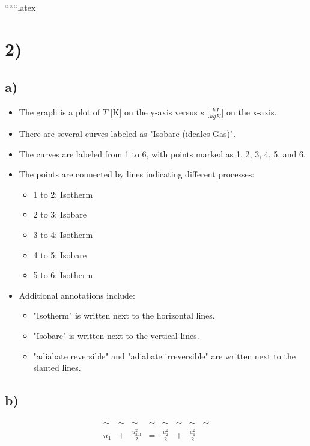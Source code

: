 
``````latex


\section*{2)}

\subsection*{a)}

\begin{itemize}
    \item The graph is a plot of \( T \) [K] on the y-axis versus \( s \) [\(\frac{kJ}{kgK}\)] on the x-axis.
    \item There are several curves labeled as "Isobare (ideales Gas)".
    \item The curves are labeled from 1 to 6, with points marked as 1, 2, 3, 4, 5, and 6.
    \item The points are connected by lines indicating different processes:
        \begin{itemize}
            \item 1 to 2: Isotherm
            \item 2 to 3: Isobare
            \item 3 to 4: Isotherm
            \item 4 to 5: Isobare
            \item 5 to 6: Isotherm
        \end{itemize}
    \item Additional annotations include:
        \begin{itemize}
            \item "Isotherm" is written next to the horizontal lines.
            \item "Isobare" is written next to the vertical lines.
            \item "adiabate reversible" and "adiabate irreversible" are written next to the slanted lines.
        \end{itemize}
\end{itemize}

\subsection*{b)}

\[
\begin{array}{cccccccc}
\sim & \sim & \sim & \sim & \sim & \sim & \sim & \sim \\
u_1 & + & \frac{u_{\text{auf}}^2}{2} & = & \frac{u_2^2}{2} & + & \frac{u_1^2}{2}
\end{array}
\]

